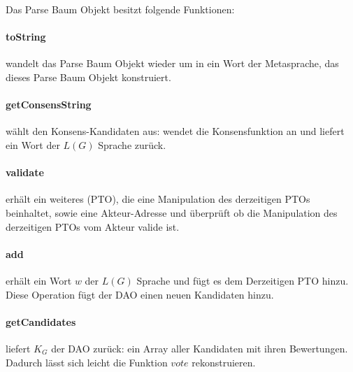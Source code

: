 \documentclass[a4paper,12pt]{report}
\begin{document}
Das Parse Baum Objekt besitzt folgende Funktionen:

\paragraph*{toString}
wandelt das Parse Baum Objekt wieder um in ein Wort der Metasprache, das dieses Parse Baum Objekt konstruiert.

\paragraph*{getConsensString}
wählt den Konsens-Kandidaten aus:
wendet die Konsensfunktion an und liefert ein Wort der $L(G)$ Sprache zurück.

\paragraph*{validate}
erhält ein weiteres (PTO), die eine Manipulation des derzeitigen PTOs beinhaltet, sowie eine Akteur-Adresse und überprüft ob die Manipulation des derzeitigen PTOs vom Akteur valide ist.

\paragraph*{add}
erhält ein Wort $w$ der $L(G)$ Sprache und fügt es dem Derzeitigen PTO hinzu. Diese Operation fügt der DAO einen neuen Kandidaten hinzu.

\paragraph*{getCandidates}
liefert $K_G$ der DAO zurück: ein Array aller Kandidaten mit ihren Bewertungen. Dadurch lässt sich leicht die Funktion $vote$ rekonstruieren.




\end{document}

